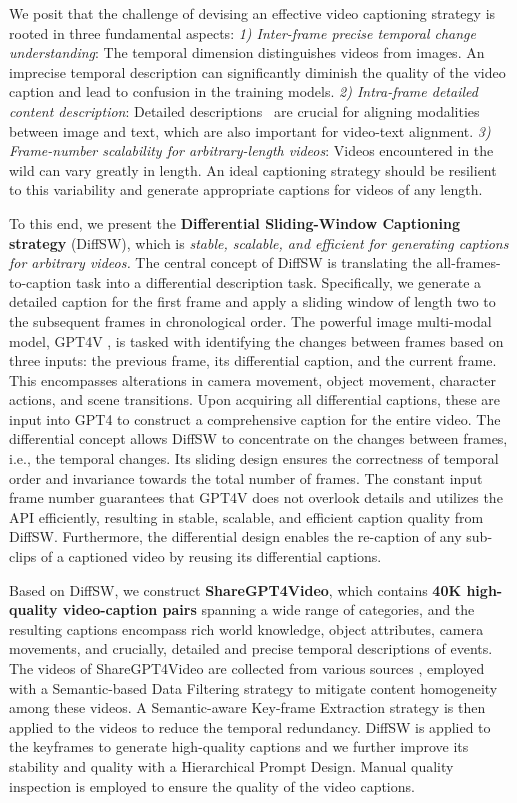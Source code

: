 We posit that the challenge of devising an effective video captioning strategy is rooted in three fundamental aspects:
\textit{1) Inter-frame precise temporal change understanding}: The temporal dimension distinguishes videos from images. An imprecise temporal description can significantly diminish the quality of the video caption and lead to confusion in the training models.
\textit{2) Intra-frame detailed content description}: Detailed descriptions~\cite{chen2023sharegpt4v} are crucial for aligning modalities between image and text, which are also important for video-text alignment.
\textit{3) Frame-number scalability for arbitrary-length videos}: Videos encountered in the wild can vary greatly in length. An ideal captioning strategy should be resilient to this variability and generate appropriate captions for videos of any length.

To this end, we present the \textbf{Differential Sliding-Window Captioning strategy} (DiffSW), which is \textit{stable, scalable, and efficient for generating captions for arbitrary videos.} The central concept of DiffSW is translating the all-frames-to-caption task into a differential description task. Specifically, we generate a detailed caption for the first frame and apply a sliding window of length two to the subsequent frames in chronological order. The powerful image multi-modal model, GPT4V \cite{gpt4v}, is tasked with identifying the changes between frames based on three inputs: the previous frame, its differential caption, and the current frame. This encompasses alterations in camera movement, object movement, character actions, and scene transitions. Upon acquiring all differential captions, these are input into GPT4 \cite{chatgpt} to construct a comprehensive caption for the entire video.
The differential concept allows DiffSW to concentrate on the changes between frames, i.e., the temporal changes. Its sliding design ensures the correctness of temporal order and invariance towards the total number of frames. The constant input frame number guarantees that GPT4V does not overlook details and utilizes the API efficiently, resulting in stable, scalable, and efficient caption quality from DiffSW. Furthermore, the differential design enables the re-caption of any sub-clips of a captioned video by reusing its differential captions.

Based on DiffSW, we construct \textbf{ShareGPT4Video}, which contains \textbf{40K high-quality video-caption pairs} spanning a wide range of categories, and the resulting captions encompass rich world knowledge, object attributes, camera movements, and crucially, detailed and precise temporal descriptions of events. 
The videos of ShareGPT4Video are collected from various sources \cite{chen2024panda,yu2020bdd100k,pexels,grauman2022ego4d,pixabay,mixkit}, employed with a Semantic-based Data Filtering strategy to mitigate content homogeneity among these videos.  A Semantic-aware Key-frame Extraction strategy is then applied to the videos to reduce the temporal redundancy. DiffSW is applied to the keyframes to generate high-quality captions and we further improve its stability and quality with a Hierarchical Prompt Design. Manual quality inspection is employed to ensure the quality of the video captions.


